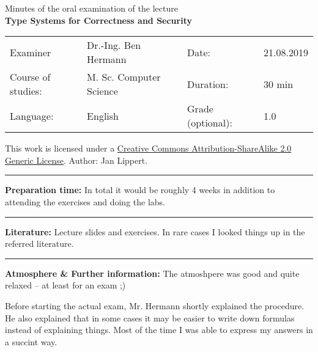 \documentclass[11pt, a4paper]{article}
\begin{document}
\begin{center}
    \begin{LARGE}
       Minutes of the oral examination of the lecture  \\
          \medskip
       \textbf{ Type Systems for Correctness and Security } %
    \end{LARGE}
\end{center}


\begin{center}
	\begin{tabular}{p{3.0cm}p{6.5cm}p{3.4cm}p{2.5cm}}
	
	Examiner           & Dr.-Ing. Ben Hermann         & Date:               & 21.08.2019 \\
	Course of studies: & M. Sc. Computer Science      & Duration:           & 30 min     \\
  Language:          & English  & Grade (optional): & 1.0     \\
	\end{tabular}
\end{center}

{\footnotesize This work is licensed under a \href{http://creativecommons.org/licenses/by-sa/2.0/}{Creative Commons Attribution-ShareAlike 2.0 Generic License}. Author: Jan Lippert. }
\hrule \bigskip




\noindent \textbf{Preparation time: }
In total it would be roughly 4 weeks in addition to attending the exercises and doing the labs. 
		
		
\bigskip \hrule \bigskip

\noindent \textbf{Literature: }
Lecture slides and exercises. In rare cases I looked things up in the referred literature.

\bigskip \hrule \bigskip

\noindent \textbf{Atmosphere \& Further information: }
The atmoshpere was good and quite relaxed -- at least for an exam ;)

Before starting the actual exam, Mr. Hermann shortly explained the procedure. He also explained that in some cases it may be easier to write down formulas instead of explaining things. Most of the time I was able to express my answers in a succint way. 
\end{document}
